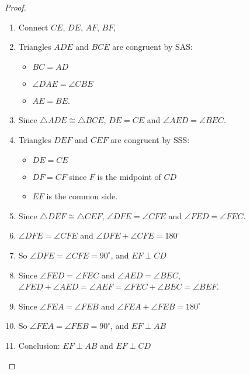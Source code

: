 \documentclass{article}
\begin{document}
\begin{proof}

~
\begin{enumerate}
    \item Connect \(CE\), \(DE\), \(AF\), \(BF\),

    \item Triangles \( ADE \) and \( BCE \) are congruent by SAS:
       \begin{itemize}
       \item \( BC = AD \)
       \item \(\angle DAE=\angle CBE\)
       \item \( AE=BE\).
       \end{itemize}

    \item Since \( \triangle ADE \cong \triangle BCE \), \(DE=CE\) and \(\angle AED=\angle BEC\).

    \item Triangles \( DEF \) and \( CEF \) are congruent by SSS:
       \begin{itemize}
       \item \( DE=CE \)
       \item \(DF=CF\) since \(F\) is the midpoint of \(CD\)
       \item \(EF\) is the common side.
       \end{itemize}

    \item Since \( \triangle DEF \cong \triangle CEF \), \(\angle DFE=\angle CFE\) and \(\angle FED=\angle FEC\).

    \item \(\angle DFE=\angle CFE\) and \(\angle DFE+\angle CFE=180^\circ\)

    \item So \(\angle DFE=\angle CFE=90^\circ\), and \(EF\perp CD\)

    \item Since \(\angle FED=\angle FEC\) and \(\angle AED=\angle BEC\), \(\angle FED+\angle AED=\angle AEF=\angle FEC+\angle BEC=\angle BEF\).

    \item Since \(\angle FEA=\angle FEB\) and \(\angle FEA+\angle FEB=180^\circ\)

    \item So \(\angle FEA=\angle FEB=90^\circ\), and \(EF\perp AB\)

    \item Conclusion: \(EF\perp AB\) and \(EF\perp CD\)
    
\end{enumerate}
\end{proof}
\end{document}
